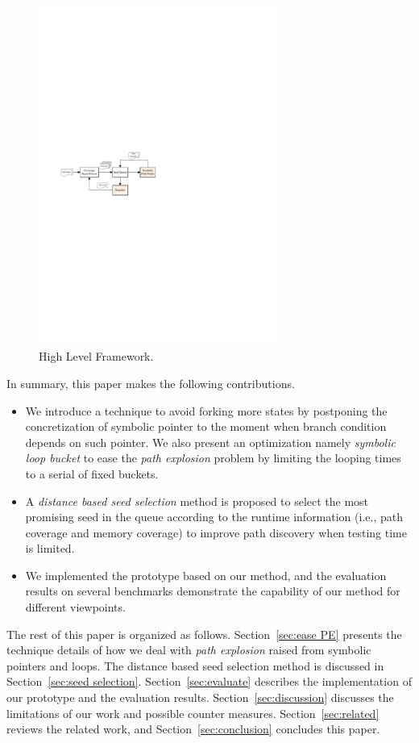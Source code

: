 \begin{figure}
\begin{center}
\includegraphics[width=0.7\textwidth]{figures/framework.pdf} 
\caption{High Level Framework.}\label{Framework}
\end{center}
\end{figure}

In summary, this paper makes the following contributions.
\begin{itemize}
\item We introduce a technique to avoid forking more states by postponing the concretization of symbolic pointer to the moment when branch condition depends on such pointer.  
 We also present an optimization namely \emph{symbolic loop bucket} to ease the \textit{path explosion} problem by limiting the looping times to a serial of fixed buckets.

\item A \emph{distance based seed selection} method is proposed to select the most promising seed 
 in the queue according to the runtime information (i.e., path coverage and memory coverage) to improve path discovery when testing time is limited. 

\item We implemented the prototype based on our method, 
 and the evaluation results on several benchmarks demonstrate the capability of our method for different viewpoints.
\end{itemize}


The rest of this paper is organized as follows. Section~\ref{sec:ease PE} presents the technique details of how we deal with \textit{path explosion} raised from symbolic pointers and loops. The distance based seed selection method is discussed in Section~\ref{sec:seed selection}. Section~\ref{sec:evaluate} describes the implementation of our prototype and the evaluation results. Section~\ref{sec:discussion} discusses the limitations of our work and possible counter measures. Section~\ref{sec:related} reviews the related work, and Section~\ref{sec:conclusion} concludes this paper.
